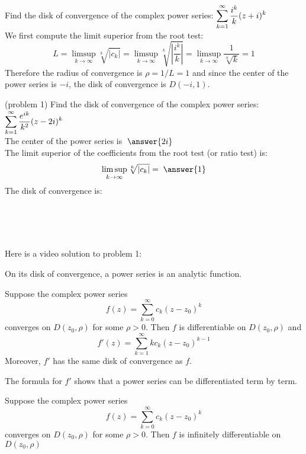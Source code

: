 \documentclass[handout]{ximera}
\begin{document}
\begin{example}[example 1]
Find the disk of convergence of the complex power series: $\displaystyle \sum_{k=1}^\infty \frac{i^k}{k}(z+i)^k$\\
We first compute the limit superior from the root test:
\[
L = \limsup_{k \to \infty} \sqrt[k]{|c_k|} = \limsup_{k \to \infty} \sqrt[k]{\left|\frac{i^k}{k}\right|} = \limsup_{k \to \infty} \frac{1}{\sqrt[k]{k}} = 1
\]
Therefore the radius of convergence is $\rho = 1/L = 1$ and since the center of the power series is $-i$, the disk of convergence is $D(-i, 1)$.
\end{example}

\begin{problem}(problem 1)
Find the disk of convergence of the complex power series: $\displaystyle \sum_{k=1}^\infty \frac{e^{ik}}{k^2}(z-2i)^k$\\
The center of the power series is $\; \answer{2i}$\\
The limit superior of the coefficients from the root test (or ratio test) is:
\[
\limsup_{k \to \infty} \sqrt[k]{|c_k|} = \; \answer{1}
\]
The disk of convergence is:
\begin{multipleChoice}
\\
\\
\\
\end{multipleChoice}
\end{problem}

Here is a video solution to problem 1:\\
\begin{foldable}
\end{foldable}


On its disk of convergence, a power series is an analytic function.
\begin{theorem}
Suppose the complex power series
\[
f(z) = \sum_{k=0}^\infty c_k(z-z_0)^k
\]
converges on $D(z_0, \rho)$ for some $\rho > 0$.
Then $f$ is differentiable on $D(z_0, \rho)$ and 
\[
f'(z) = \sum_{k=1}^\infty kc_k(z-z_0)^{k-1}
\]
Moreover, $f'$ has the same disk of convergence as $f$.
\end{theorem}
\begin{remark}
The formula for $f'$ shows that a power series can be differentiated term by term.
\end{remark}
\begin{corollary}
Suppose the complex power series
\[
f(z) = \sum_{k=0}^\infty c_k(z-z_0)^k
\]
converges on $D(z_0, \rho)$ for some $\rho > 0$.
Then $f$ is infinitely differentiable on $D(z_0, \rho)$
\end{corollary}
\end{document}

